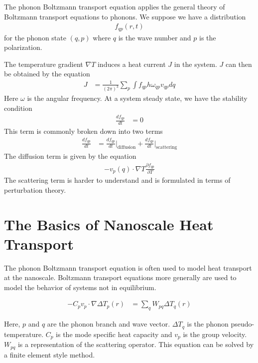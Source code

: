 \documentclass[book.tex]{subfiles}
\begin{document}
The phonon Boltzmann transport equation applies the general theory of Boltzmann transport equations to phonons. We suppose we have a distribution
\begin{align}
    f_{qp}(r, t)
\end{align}
for the phonon state $(q, p)$ where $q$ is the wave number and $p$ is the polarization. 

The temperature gradient $\nabla T$ induces a heat current $J$ in the system. $J$ can then be obtained by the equation
\begin{align}
    J &= \frac{1}{(2\pi)^3}\sum_p \int f_{qp} h \omega_{qp} v_{qp} dq
\end{align}
Here $\omega$ is the angular frequency. At a system steady state, we have the stability condition
\begin{align}
    \frac{df_{qp}}{dt} &= 0
\end{align}
This term is commonly broken down into two terms
\begin{align}
    \frac{df_{qp}}{dt} &=  \frac{df_{qp}}{dt} \vert_{\mathrm{diffusion}} + \frac{df_{qp}}{dt} \vert_{\mathrm{scattering}}
\end{align}
The diffusion term is given by the equation
\begin{align}
    -v_p(q) \cdot \nabla T \frac{\partial f_{qp}}{\partial T}
\end{align}
The scattering term is harder to understand and is formulated in terms of perturbation theory.

\section{The Basics of Nanoscale Heat Transport}

The phonon Boltzmann transport equation is often used to model heat transport at the nanoscale. Boltzmann transport equations more generally are used to model the behavior of systems not in equilibrium. 

\begin{align}
    -C_p  v_p \cdot \nabla \Delta T_p(r) &= \sum_q W_{pq} \Delta T_q(r)
\end{align}

Here, $p$ and $q$ are the phonon branch and wave vector. $\Delta T_q$ is the phonon pseudo-temperature. $C_p$ is the mode specific heat capacity and $v_p$ is the group velocity. $W_{p q}$ is a representation of the scattering operator. This equation can be solved by a finite element style method.
\end{document}
